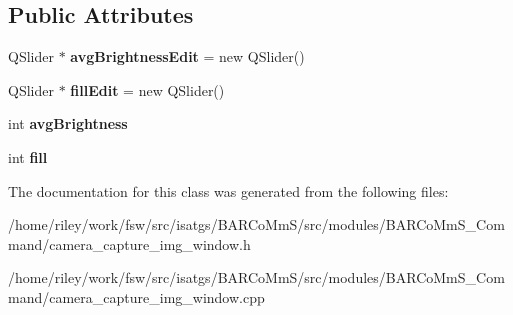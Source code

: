 \subsection*{Public Attributes}
\begin{DoxyCompactItemize}
\item 
Q\+Slider $\ast$ {\bfseries avg\+Brightness\+Edit} = new Q\+Slider()\hypertarget{class_camera___capture___img___window_a5b687b585b4d29b277d8f69b521a9c51}{}\label{class_camera___capture___img___window_a5b687b585b4d29b277d8f69b521a9c51}

\item 
Q\+Slider $\ast$ {\bfseries fill\+Edit} = new Q\+Slider()\hypertarget{class_camera___capture___img___window_a452c7674f459af25a7648b8905a1f8c2}{}\label{class_camera___capture___img___window_a452c7674f459af25a7648b8905a1f8c2}

\item 
int {\bfseries avg\+Brightness}\hypertarget{class_camera___capture___img___window_a0e106b401683866ab721d170bc8db4fa}{}\label{class_camera___capture___img___window_a0e106b401683866ab721d170bc8db4fa}

\item 
int {\bfseries fill}\hypertarget{class_camera___capture___img___window_ab19dbab3c1b5e12e1b5242b50203a42a}{}\label{class_camera___capture___img___window_ab19dbab3c1b5e12e1b5242b50203a42a}

\end{DoxyCompactItemize}


The documentation for this class was generated from the following files\+:\begin{DoxyCompactItemize}
\item 
/home/riley/work/fsw/src/isatgs/\+B\+A\+R\+Co\+Mm\+S/src/modules/\+B\+A\+R\+Co\+Mm\+S\+\_\+\+Command/camera\+\_\+capture\+\_\+img\+\_\+window.\+h\item 
/home/riley/work/fsw/src/isatgs/\+B\+A\+R\+Co\+Mm\+S/src/modules/\+B\+A\+R\+Co\+Mm\+S\+\_\+\+Command/camera\+\_\+capture\+\_\+img\+\_\+window.\+cpp\end{DoxyCompactItemize}
